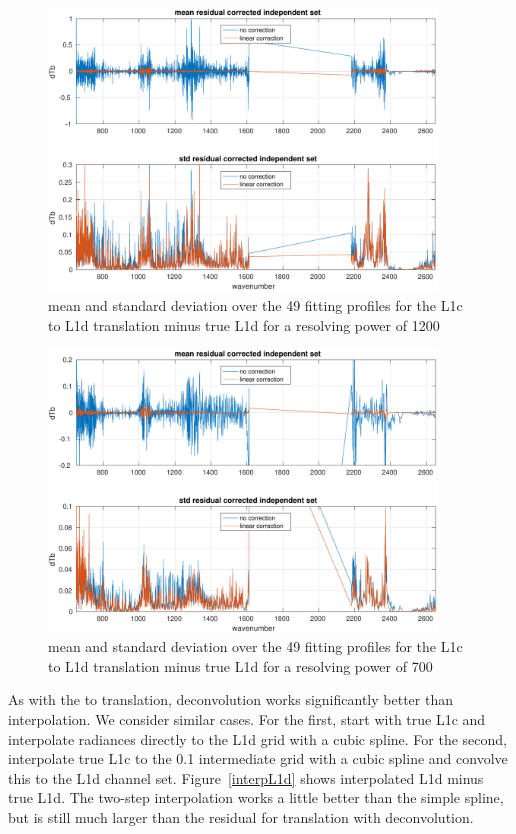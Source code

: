 \documentclass[11pt]{article}
\begin{document}
\begin{figure} %
  \centering
  \includegraphics[height=7.5cm]{figures/L1d_corr_1200.pdf}
  \caption{mean and standard deviation over the 49 fitting profiles
    for the L1c to L1d translation minus true L1d for a resolving
    power of 1200}
  \label{L1d1200}
\end{figure}

\begin{figure} %
  \centering
  \includegraphics[height=7.5cm]{figures/L1d_corr_700.pdf}
  \caption{mean and standard deviation over the 49 fitting profiles
    for the L1c to L1d translation minus true L1d for a resolving
    power of 700}
  \label{L1d700s}
\end{figure}

As with the {\airs} to {\cris} translation, deconvolution works
significantly better than interpolation.  We consider similar cases.
For the first, start with true L1c and interpolate radiances
directly to the L1d grid with a cubic spline.  For the second,
interpolate true L1c to the 0.1 {\wn} intermediate grid with a cubic
spline and convolve this to the L1d channel set.
Figure~\ref{interpL1d} shows interpolated L1d minus true L1d.  The
two-step interpolation works a little better than the simple spline,
but is still much larger than the residual for translation with
deconvolution.
\end{document}
